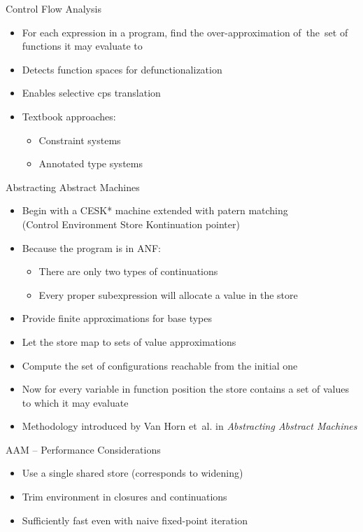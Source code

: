 \documentclass{beamer}
\begin{document}
\begin{frame}{Control Flow Analysis}
  \begin{itemize}
    \item For each expression in a program, find the over-approximation of~the~set of functions it may evaluate to
    \item Detects function spaces for defunctionalization
    \item Enables selective cps translation
    \pause
    \item Textbook approaches:
    \begin{itemize}
      \item Constraint systems
      \item Annotated type systems
    \end{itemize}
  \end{itemize}
\end{frame}

\begin{frame}{Abstracting Abstract Machines}
  \begin{itemize}
    \item Begin with a CESK* machine extended with patern matching\\
      (Control Environment Store Kontinuation pointer)\pause
    \item Because the program is in ANF:
    \begin{itemize}
      \item There are only two types of continuations
      \item Every proper subexpression will allocate a value in the store
    \end{itemize}\pause
    \item Provide finite approximations for base types
    \item Let the store map to sets of value approximations\pause
    \item Compute the set of configurations reachable from the initial one\pause
    \item Now for every variable in function position the store contains a set of values to which it may evaluate\pause
    \item Methodology introduced by Van Horn et~al. in \textit{Abstracting Abstract Machines}
  \end{itemize}
\end{frame}

\begin{frame}{AAM -- Performance Considerations}
  \begin{itemize}
    \item Use a single shared store (corresponds to widening)\pause
    \item Trim environment in closures and continuations\pause
    \item Sufficiently fast even with naive fixed-point iteration
  \end{itemize}
\end{frame}
\end{document}
